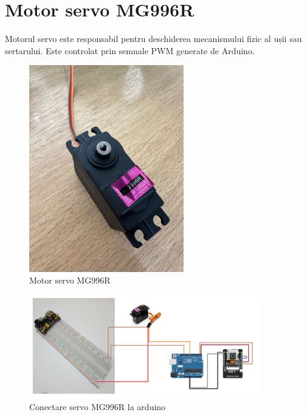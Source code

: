 \documentclass{report}
\begin{document}
\section{Motor servo MG996R}
Motorul servo este responsabil pentru deschiderea mecanismului fizic al ușii sau sertarului. Este controlat prin semnale PWM generate de Arduino.

\begin{figure}[H]
    \centering
    \includegraphics[width=0.6\textwidth]{servo_motor.jpg}
    \caption{Motor servo MG996R}
    \label{fig:servo_motor}
\end{figure}

\begin{figure}[H]
    \centering
    \includegraphics[width=0.9\textwidth]{motorEX.png}
    \caption{Conectare servo MG996R la arduino}
    \label{fig:servo_motor}
\end{figure}
\newpage
\vspace*{1cm}
\end{document}
